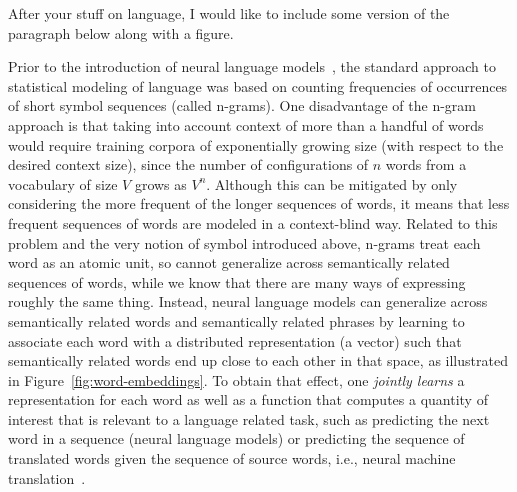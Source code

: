\documentclass[10pts]{article}
\begin{document}
After your stuff on language, I would like to include some version of the
paragraph below along with a figure.
\fi

Prior to the introduction of neural language
models~\citep{BenDucVin01-short}, the standard approach to statistical
modeling of language was based on counting frequencies of occurrences of
short symbol sequences (called n-grams). One disadvantage of the n-gram
approach is that taking into account context of more than a handful of words would require
training corpora of exponentially growing size (with respect to the
desired context size), since the number of configurations of $n$
words from a vocabulary of size $V$ grows as $V^n$. Although this can
be mitigated by only considering the more frequent of the longer sequences of 
words, it means that less frequent sequences of words are modeled in a 
context-blind way. Related to this
problem and the very notion of symbol introduced above, n-grams
treat each word as an atomic unit, so cannot generalize across
semantically related sequences of words,
while we know that there are many ways of expressing roughly the same thing.
Instead, neural language models can generalize across semantically related words
and semantically related phrases by learning to associate each word with a
distributed representation (a vector) such that semantically related
words end up close to each other in that space, as illustrated in
Figure~\ref{fig:word-embeddings}. To obtain that effect, one
{\em jointly learns} a representation for each word as well as
a function that computes a quantity of interest that is relevant
to a language related task, such as predicting the next word
in a sequence (neural language models) or predicting the sequence
of translated words given the sequence of source words, i.e., neural
machine translation~\citep{Devlin-et-al-ACL2014,Bahdanau-et-al-arxiv2014,
Sutskever-et-al-NIPS2014}.
\end{document}
